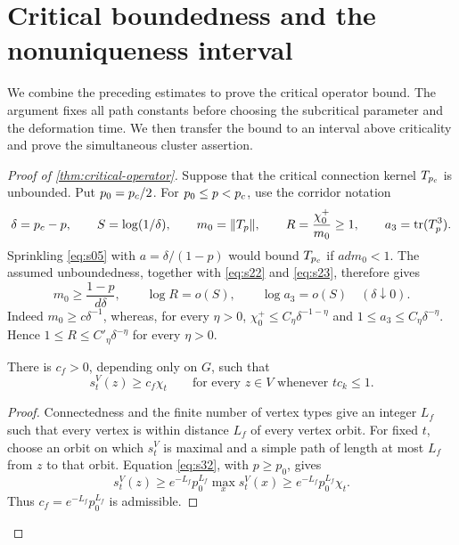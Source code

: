 \section{Critical boundedness and the nonuniqueness interval}
\label{con:section}

We combine the preceding estimates to prove the critical operator bound.
The argument fixes all path constants before choosing the subcritical
parameter and the deformation time. We then transfer the bound to an
interval above criticality and prove the simultaneous cluster assertion.

\begin{proof}[Proof of \cref{thm:critical-operator}]
Suppose that the critical connection kernel $T_{{p_c}}$ is unbounded.
Put $p_0={p_c}/2$. For $p_0\le p<{p_c}$, use the corridor notation
\[
 \delta={p_c}-p,\qquad S=\log(1/\delta),\qquad
 m_0=\lVert T_p\rVert,\qquad R=\frac{\chi_0^+}{m_0}\ge1,
 \qquad a_3=\operatorname{tr}(T_p^3).
\]
Sprinkling \eqref{eq:s05} with $a=\delta/(1-p)$ would bound
$T_{{p_c}}$ if $ad m_0<1$. The assumed unboundedness, together with
\eqref{eq:s22} and \eqref{eq:s23}, therefore gives
\begin{equation}
 m_0\ge\frac{1-p}{d\delta},\qquad
 \log R=o(S),\qquad \log a_3=o(S)
 \quad(\delta\downarrow0).
 \label{eq:s35}
\end{equation}
Indeed $m_0\ge c\delta^{-1}$, whereas, for every $\eta>0$,
$\chi_0^+\le C_\eta\delta^{-1-\eta}$ and
$1\le a_3\le C_\eta\delta^{-\eta}$. Hence
$1\le R\le C'_\eta\delta^{-\eta}$ for every $\eta>0$.

\begin{claim}
\label{con:row-comparison}
There is $c_f>0$, depending only on $G$, such that
\begin{equation}
 s_t^V(z)\ge c_f\chi_t
 \qquad\text{for every $z\in V$ whenever $tc_k\le1$}.
 \label{eq:s36}
\end{equation}
\end{claim}

\begin{proof}
Connectedness and the finite number of vertex types give an integer
$L_f$ such that every vertex is within distance $L_f$ of every vertex
orbit. For fixed $t$, choose an orbit on which $s_t^V$ is maximal and
a simple path of length at most $L_f$ from $z$ to that orbit.
Equation \eqref{eq:s32}, with $p\ge p_0$, gives
\[
 s_t^V(z)\ge e^{-L_f}p_0^{L_f}\max_x s_t^V(x)
 \ge e^{-L_f}p_0^{L_f}\chi_t.
\]
Thus $c_f=e^{-L_f}p_0^{L_f}$ is admissible.
\end{proof}


\end{proof}
